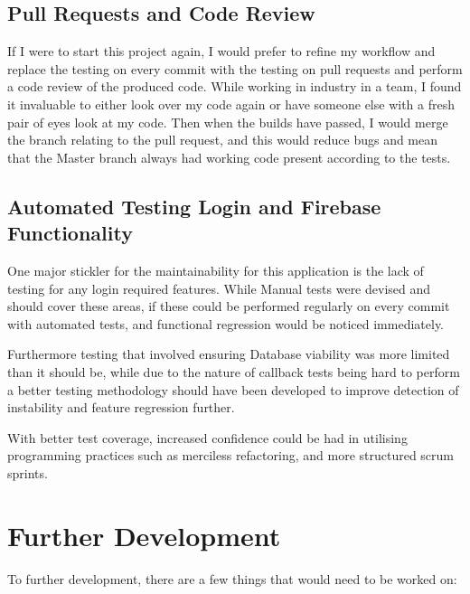    \subsection{Pull Requests and Code Review}
    If I were to start this project again, I would prefer to refine my workflow and replace the testing on every commit with the testing on pull requests and perform a code review of the produced code. While working in industry in a team, I found it invaluable to either look over my code again or have someone else with a fresh pair of eyes look at my code. Then when the builds have passed, I would merge the branch relating to the pull request, and this would reduce bugs and mean that the Master branch always had working code present according to the tests.
    
    \subsection{Automated Testing Login and Firebase Functionality}
    One major stickler for the maintainability for this application is the lack of testing for any login required features. While Manual tests were devised and should cover these areas, if these could be performed regularly on every commit with automated tests, and functional regression would be noticed immediately. 
    
    Furthermore testing that involved ensuring Database viability was more limited than it should be, while due to the nature of callback tests being hard to perform a better testing methodology should have been developed to improve detection of instability and feature regression further.
    
    With better test coverage, increased confidence could be had in utilising programming practices such as merciless refactoring, and more structured scrum sprints.
    
\section{Further Development}

To further development, there are a few things that would need to be worked on:

